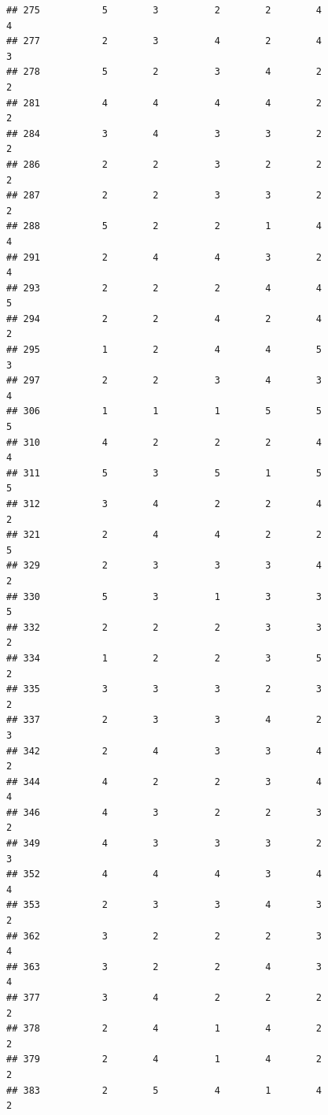 \documentclass[
]{article}
\begin{document}
\begin{verbatim}
## 275           5        3          2        2        4               4
## 277           2        3          4        2        4               3
## 278           5        2          3        4        2               2
## 281           4        4          4        4        2               2
## 284           3        4          3        3        2               2
## 286           2        2          3        2        2               2
## 287           2        2          3        3        2               2
## 288           5        2          2        1        4               4
## 291           2        4          4        3        2               4
## 293           2        2          2        4        4               5
## 294           2        2          4        2        4               2
## 295           1        2          4        4        5               3
## 297           2        2          3        4        3               4
## 306           1        1          1        5        5               5
## 310           4        2          2        2        4               4
## 311           5        3          5        1        5               5
## 312           3        4          2        2        4               2
## 321           2        4          4        2        2               5
## 329           2        3          3        3        4               2
## 330           5        3          1        3        3               5
## 332           2        2          2        3        3               2
## 334           1        2          2        3        5               2
## 335           3        3          3        2        3               2
## 337           2        3          3        4        2               3
## 342           2        4          3        3        4               2
## 344           4        2          2        3        4               4
## 346           4        3          2        2        3               2
## 349           4        3          3        3        2               3
## 352           4        4          4        3        4               4
## 353           2        3          3        4        3               2
## 362           3        2          2        2        3               4
## 363           3        2          2        4        3               4
## 377           3        4          2        2        2               2
## 378           2        4          1        4        2               2
## 379           2        4          1        4        2               2
## 383           2        5          4        1        4               2

\end{verbatim}
\end{document}
